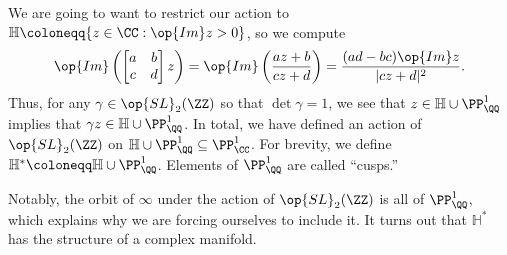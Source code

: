 \documentclass{amsart}
\begin{document}
We are going to want to restrict our action to $\mathbb H\coloneqq\{z\in\CC:\op{Im}z>0\}$, so we compute
\[\op{Im}\left(\begin{bmatrix}
	a & b \\
	c & d
\end{bmatrix}z\right)=\op{Im}\left(\frac{az+b}{cz+d}\right)=\frac{(ad-bc)\op{Im}z}{|cz+d|^2}.\]
Thus, for any $\gamma\in\op{SL}_2(\ZZ)$ so that $\det\gamma=1$, we see that $z\in\mathbb H\cup\PP^1_\QQ$ implies that $\gamma z\in\mathbb H\cup\PP^1_\QQ$. In total, we have defined an action of $\op{SL}_2(\ZZ)$ on $\mathbb H\cup\PP^1_\QQ\subseteq\PP^1_\CC$. For brevity, we define $\mathbb H^*\coloneqq\mathbb H\cup\PP^1_\QQ$. Elements of $\PP^1_\QQ$ are called ``cusps.''
\begin{remark}
	Notably, the orbit of $\infty$ under the action of $\op{SL}_2(\ZZ)$ is all of $\PP^1_\QQ$, which explains why we are forcing ourselves to include it. It turns out that $\mathbb H^*$ has the structure of a complex manifold.
\end{remark}

\end{document}
